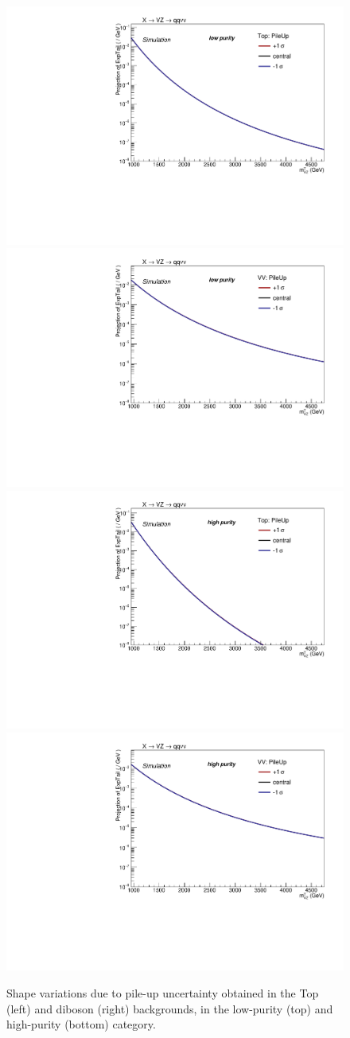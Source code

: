  \begin{figure}[!htb]
   \begin{center}
     \includegraphics[width=.495\textwidth]{plotsAlpha_tesi/XVZnnlp/SysTop_PileUp.pdf}
     \includegraphics[width=.495\textwidth]{plotsAlpha_tesi/XVZnnlp/SysVV_PileUp.pdf}
     \\
     \includegraphics[width=.495\textwidth]{plotsAlpha_tesi/XVZnnhp/SysTop_PileUp.pdf}
     \includegraphics[width=.495\textwidth]{plotsAlpha_tesi/XVZnnhp/SysVV_PileUp.pdf}

   \end{center}
   \caption{Shape variations due to pile-up uncertainty obtained in the Top (left) and diboson (right) backgrounds, in the low-purity (top) and high-purity (bottom) category.}
   \label{fig:syspileup}
 \end{figure}


